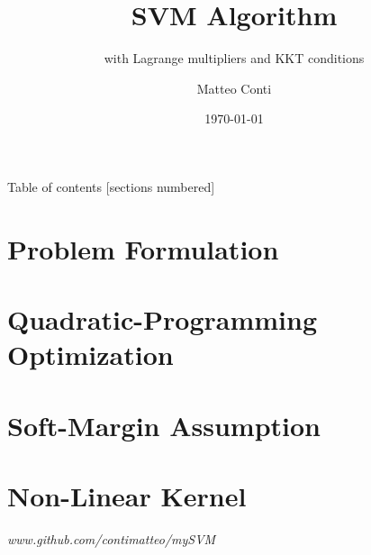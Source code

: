 \documentclass[10pt]{beamer}
\title{SVM Algorithm}
\subtitle{with Lagrange multipliers and KKT conditions}
\date{\today}
\author{Matteo Conti}
\institute{University of Bologna}
\begin{document}
\maketitle

\begin{frame}{Table of contents}
  [sections numbered]
  \tableofcontents[hideallsubsections]
\end{frame}


\section{Problem Formulation}



\section{Quadratic-Programming Optimization}



\section{Soft-Margin Assumption}



\section{Non-Linear Kernel}



\begin{frame}[standout]
  \small{\emph{www.github.com/contimatteo/mySVM}}
\end{frame}

\end{document}
